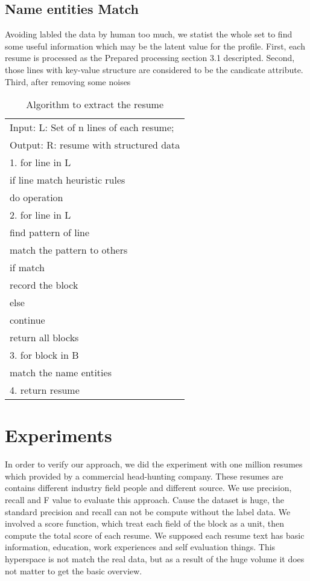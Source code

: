 \documentclass{acm_proc_article-sp}
\begin{document}
\subsection{Name entities Match}

Avoiding labled the data by human too much, we statist the whole set to find some useful information which may be the latent value for the profile.
First, each resume is processed as the Prepared processing section 3.1 descripted.
Second, those lines with key-value structure are considered to be the candicate attribute.
Third, after removing some noises

\begin{table}
\centering
\caption{Algorithm to extract the resume}
\begin{tabular}{|l|} \hline
Input: L: Set of n lines of each resume;\\
Output: R: resume with structured data \\ \hline
1. for line in L\\
	if line match heuristic rules\\
		do operation\\
2. for line in L\\
	find pattern of line\\
	match the pattern to others\\
	if match\\
		record the block\\
	else\\
		continue\\
	return all blocks\\
3. for block in B\\
	match the name entities\\
4. return resume\\
\hline
\end{tabular}
\end{table}

\section{Experiments}

In order to verify our approach, we did the experiment with one million resumes which provided by a commercial head-hunting company. 
These resumes are contains different industry field people and different source.
We use precision, recall and F value to evaluate this approach.
Cause the dataset is huge, the standard precision and recall can not be compute without the label data.
We involved a score function, which treat each field of the block as a unit, then compute the total score of each resume.
We supposed each resume text has basic information, education, work experiences and self evaluation things.
This hyperspace is not match the real data, but as a result of the huge volume it does not matter to get the basic overview.
\end{document}
